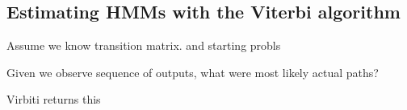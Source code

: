 
\subsection{Estimating HMMs with the Viterbi algorithm}

Assume we know transition matrix. and starting probls

Given we observe sequence of outputs, what were most likely actual paths?

Virbiti returns this

